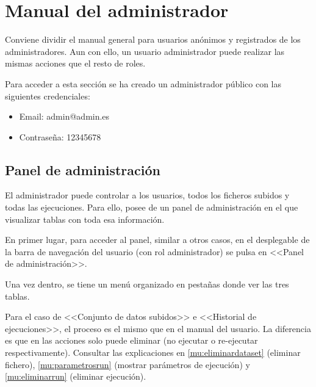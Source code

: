 

\section{Manual del administrador}

Conviene dividir el manual general para usuarios anónimos y registrados de los
administradores. Aun con ello, un usuario administrador puede realizar las
mismas acciones que el resto de roles.

Para acceder a esta sección se ha creado un administrador público con las
siguientes credenciales:
\begin{itemize}
    \item Email: admin@admin.es
    \item Contraseña: 12345678
\end{itemize}

\subsection{Panel de administración}

El administrador puede controlar a los usuarios, todos los ficheros subidos y
todas las ejecuciones. Para ello, posee de un panel de administración en el que
visualizar tablas con toda esa información.

En primer lugar, para acceder al panel, similar a otros casos, en el desplegable
de la barra de navegación del usuario (con rol administrador) se pulsa en
<<Panel de administración>>.


Una vez dentro, se tiene un menú organizado en pestañas donde ver las tres tablas.




Para el caso de <<Conjunto de datos subidos>> e <<Historial de ejecuciones>>, el
proceso es el mismo que en el manual del usuario. La diferencia es que en las
acciones solo puede eliminar (no ejecutar o re-ejecutar respectivamente).
Consultar las explicaciones  en \ref{mu:eliminardataset} (eliminar fichero),
\ref{mu:parametrosrun} (mostrar parámetros de ejecución) y \ref{mu:eliminarrun}
(eliminar ejecución).


